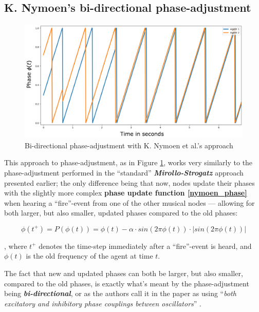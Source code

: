 	
	
	
	\subsection{K. Nymoen's bi-directional phase-adjustment} %
	
	\begin{figure}[h]
		\centering
		\includegraphics[width=0.9\linewidth]{Assets/Figures/KNymoenPhaseAdjustmentSecondTry.pdf}
		\caption{Bi-directional phase-adjustment with K. Nymoen et al.'s approach}
		\label{fig:nymoen_phase}
	\end{figure}
	
	This approach to phase-adjustment, as in Figure \ref{fig:nymoen_phase}, works very similarly to the phase-adjustment performed in the ``standard'' \textbf{\textit{Mirollo-Strogatz}} approach presented earlier; the only difference being that now, nodes update their phases with the slightly more complex \textbf{phase update function \eqref{nymoen_phase}} when hearing a ``fire''-event from one of the other musical nodes — allowing for both larger, but also smaller, updated phases compared to the old phases:
	
	\begin{equation}
	\label{nymoen_phase}
		\phi(t^+)=P(\phi(t)) = \phi(t) - \alpha \cdot sin(2\pi\phi(t)) \cdot | sin(2\pi\phi(t)) |
	\end{equation}
	
	, where $t^+$ denotes the time-step immediately after a ``fire''-event is heard, and $\phi(t)$ is the old frequency of the agent at time $t$.
	
	The fact that new and updated phases can both be larger, but also smaller, compared to the old phases, is exactly what's meant by the phase-adjustment being \textbf{\textit{bi-directional}}, or as the authors call it in the paper as using ``\textit{both excitatory and inhibitory phase couplings between oscillators}'' \cite{nymoen_synch}.
	
